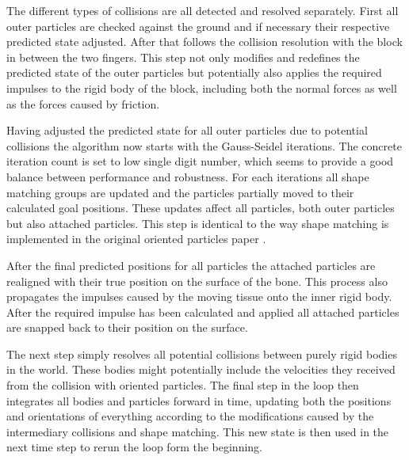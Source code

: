 The different types of collisions are all detected and resolved separately. First all outer particles are checked against the ground and if necessary their respective predicted state adjusted. After that follows the collision resolution with the block in between the two fingers. This step not only modifies and redefines the predicted state of the outer particles but potentially also applies the required impulses to the rigid body of the block, including both the normal forces as well as the forces caused by friction.

Having adjusted the predicted state for all outer particles due to potential collisions the algorithm now starts with the Gauss-Seidel iterations. The concrete iteration count is set to low single digit number, which seems to provide a good balance between performance and robustness. For each iterations all shape matching groups are updated and the particles partially moved to their calculated goal positions. These updates affect all particles, both outer particles but also attached particles. This step is identical to the way shape matching is implemented in the original oriented particles paper \cite{Muller:2011gn}.

After the final predicted positions for all particles the attached particles are realigned with their true position on the surface of the bone. This process also propagates the impulses caused by the moving tissue onto the inner rigid body. After the required impulse has been calculated and applied all attached particles are snapped back to their position on the surface.

The next step simply resolves all potential collisions between purely rigid bodies in the world. These bodies might potentially include the velocities they received from the collision with oriented particles. The final step in the loop then integrates all bodies and particles forward in time, updating both the positions and orientations of everything according to the modifications caused by the intermediary collisions and shape matching. This new state is then used in the next time step to rerun the loop form the beginning.